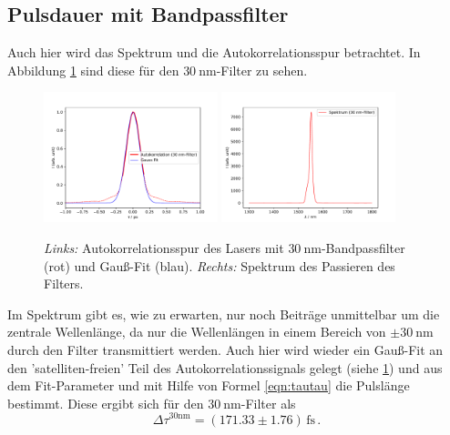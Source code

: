     \subsection{Pulsdauer mit Bandpassfilter}
        Auch hier wird das Spektrum und die Autokorrelationsspur betrachtet. In Abbildung \ref{fig:30} sind diese für den $\SI{30}{\nano\metre}$-Filter zu sehen.
        \begin{figure}
            \centering
            \includegraphics[width = 0.45\textwidth]{pictures/Puls_30.pdf}
            \includegraphics[width = 0.45\textwidth]{pictures/Spektrum_30.pdf}
            \caption{\textit{Links:} Autokorrelationsspur des Lasers mit $\SI{30}{\nano\metre}$-Bandpassfilter (rot) und Gauß-Fit (blau). \textit{Rechts:} Spektrum des Passieren des Filters.}
            \label{fig:30}    
        \end{figure}
        Im Spektrum gibt es, wie zu erwarten, nur noch Beiträge unmittelbar um die zentrale Wellenlänge, da nur die Wellenlängen in einem Bereich von $\pm \SI{30}{\nano\metre}$ durch den Filter transmittiert werden. Auch hier wird wieder ein Gauß-Fit an den 'satelliten-freien' Teil des Autokorrelationssignals gelegt (siehe \ref{fig:30}) und aus dem Fit-Parameter und mit Hilfe von Formel \ref{eqn:tautau} die Pulslänge bestimmt. Diese ergibt sich für den $\SI{30}{\nano\metre}$-Filter als
        \begin{equation}
            \Delta \tau^{\text{30nm}} = (171.33\pm 1.76)\,\text{fs} \, .
        \end{equation}

